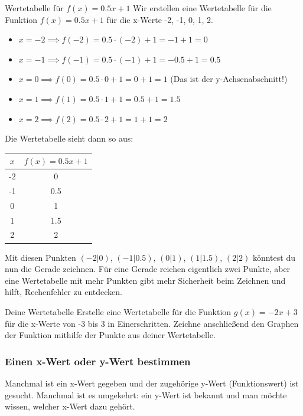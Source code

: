 \begin{beispielumgebung}{Wertetabelle für $f(x) = 0.5x + 1$}
Wir erstellen eine Wertetabelle für die Funktion $f(x) = 0.5x + 1$ für die x-Werte -2, -1, 0, 1, 2.

\begin{itemize}
    \item $x = -2 \implies f(-2) = 0.5 \cdot (-2) + 1 = -1 + 1 = 0$
    \item $x = -1 \implies f(-1) = 0.5 \cdot (-1) + 1 = -0.5 + 1 = 0.5$
    \item $x =  0 \implies f(0)  = 0.5 \cdot 0 + 1 = 0 + 1 = 1$ (Das ist der y-Achsenabschnitt!)
    \item $x =  1 \implies f(1)  = 0.5 \cdot 1 + 1 = 0.5 + 1 = 1.5$
    \item $x =  2 \implies f(2)  = 0.5 \cdot 2 + 1 = 1 + 1 = 2$
\end{itemize}

Die Wertetabelle sieht dann so aus:
\begin{center}
\begin{tabular}{c|c}
$x$ & $f(x) = 0.5x + 1$ \\
\hline
-2  & 0 \\
-1  & 0.5 \\
0   & 1 \\
1   & 1.5 \\
2   & 2 \\
\end{tabular}
\end{center}
Mit diesen Punkten $(-2|0)$, $(-1|0.5)$, $(0|1)$, $(1|1.5)$, $(2|2)$ könntest du nun die Gerade zeichnen. Für eine Gerade reichen eigentlich zwei Punkte, aber eine Wertetabelle mit mehr Punkten gibt mehr Sicherheit beim Zeichnen und hilft, Rechenfehler zu entdecken.
\end{beispielumgebung}

\begin{aufgabenumgebung}{Deine Wertetabelle}
Erstelle eine Wertetabelle für die Funktion $g(x) = -2x + 3$ für die x-Werte von -3 bis 3 in Einerschritten. Zeichne anschließend den Graphen der Funktion mithilfe der Punkte aus deiner Wertetabelle.
\end{aufgabenumgebung}

\subsubsection{Einen x-Wert oder y-Wert bestimmen}
Manchmal ist ein x-Wert gegeben und der zugehörige y-Wert (Funktionswert) ist gesucht. Manchmal ist es umgekehrt: ein y-Wert ist bekannt und man möchte wissen, welcher x-Wert dazu gehört.

